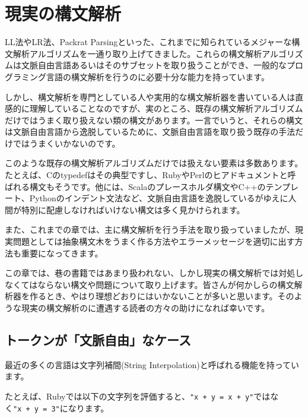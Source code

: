 \thispagestyle{empty}
\chapter{現実の構文解析}\label{ch06}

LL法やLR法、Packrat Parsingといった、これまでに知られているメジャーな構文解析アルゴリズムを一通り取り上げてきました。これらの構文解析アルゴリズムは文脈自由言語あるいはそのサブセットを取り扱うことができ、一般的なプログラミング言語の構文解析を行うのに必要十分な能力を持っています。

しかし、構文解析を専門としている人や実用的な構文解析器を書いている人は直感的に理解していることなのですが、実のところ、既存の構文解析アルゴリズムだけではうまく取り扱えない類の構文があります。一言でいうと、それらの構文は文脈自由言語から逸脱しているために、文脈自由言語を取り扱う既存の手法だけではうまくいかないのです。

このような既存の構文解析アルゴリズムだけでは扱えない要素は多数あります。たとえば、Cのtypedefはその典型ですし、RubyやPerlのヒアドキュメントと呼ばれる構文もそうです。他には、Scalaのプレースホルダ構文やC++のテンプレート、Pythonのインデント文法など、文脈自由言語を逸脱しているがゆえに人間が特別に配慮しなければいけない構文は多く見かけられます。

また、これまでの章では、主に構文解析を行う手法を取り扱っていましたが、現実問題としては抽象構文木をうまく作る方法やエラーメッセージを適切に出す方法も重要になってきます。

この章では、巷の書籍ではあまり扱われない、しかし現実の構文解析では対処しなくてはならない構文や問題について取り上げます。皆さんが何かしらの構文解析器を作るとき、やはり理想どおりにはいかないことが多いと思います。そのような現実の構文解析のに遭遇する読者の方々の助けになれば幸いです。

\section{トークンが「文脈自由」なケース}

最近の多くの言語は文字列補間(String
Interpolation)と呼ばれる機能を持っています。

たとえば、Rubyでは以下の文字列を評価すると、\texttt{"x\ +\ y\ =\ x\ +\ y"}ではなく\texttt{"x\ +\ y\ =\ 3"}になります。

